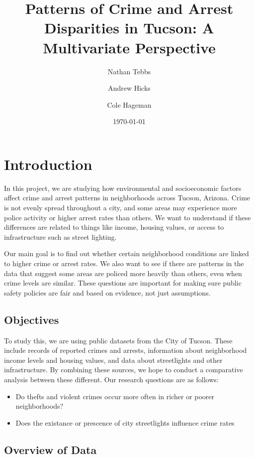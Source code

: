 \documentclass{report}
\title{\textbf{Patterns of Crime and Arrest Disparities in Tucson: A Multivariate Perspective}}
\author{Nathan Tebbs \and Andrew Hicks \and Cole Hageman}
\date{\today}
\begin{document}
\maketitle
\tableofcontents


	\chapter{Introduction}
	
	In this project, we are studying how environmental and socioeconomic factors affect crime and arrest patterns in neighborhoods across Tucson, Arizona. Crime is not evenly spread throughout a city, and some areas may experience more police activity or higher arrest rates than others. We want to understand if these differences are related to things like income, housing values, or access to infrastructure such as street lighting.
	
	Our main goal is to find out whether certain neighborhood conditions are linked to higher crime or arrest rates. We also want to see if there are patterns in the data that suggest some areas are policed more heavily than others, even when crime levels are similar. These questions are important for making sure public safety policies are fair and based on evidence, not just assumptions.
	
	\newpage
	\section{Objectives}
	
	To study this, we are using public datasets from the City of Tucson. These include records of reported crimes and arrests, information about neighborhood income levels and housing values, and data about streetlights and other infrastructure. By combining these sources, we hope to conduct a comparative analysis between these different. Our research questions are as follows:
	
	\begin{itemize}
		\item Do thefts and violent crimes occur more often in richer or poorer neighborhoods?
		\item Does the existance or prescence of city streetlights influence crime rates
	\end{itemize}
	
	\section{Overview of Data}
	
\end{document}
